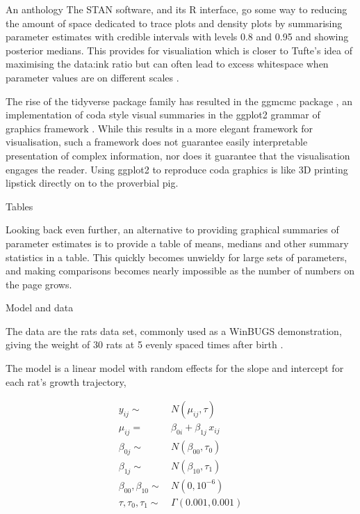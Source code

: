 {\begin{columns}
\begin{column}[t]{0.45\linewidth}
\begin{block}{An anthology}
The STAN software, and its R interface, go some way to reducing the amount of space dedicated to trace plots and density plots by summarising parameter estimates with credible intervals with levels 0.8 and 0.95 and showing posterior medians. This provides for visualiation which is closer to Tufte's idea of maximising the data:ink ratio but can often lead to excess whitespace when parameter values are on different scales \citep{tufte1983visual}.

The rise of the tidyverse package family \citep{tidyverse} has resulted in the ggmcmc package \citep{ggmcmc}, an implementation of coda style visual summaries in the ggplot2 grammar of graphics framework \citep{ggplot2}. While this results in a more elegant framework for visualisation, such a framework does not guarantee easily interpretable presentation of complex information, nor does it guarantee that the visualisation engages the reader. Using ggplot2 to reproduce coda graphics is like 3D printing lipstick directly on to the proverbial pig.

\end{block}

\begin{block}{Tables}
\setlength{\parskip}{15pt}
	
Looking back even further, an alternative to providing graphical summaries of parameter estimates is to provide a table of means, medians and other summary statistics in a table. This quickly becomes unwieldy for large sets of parameters, and making comparisons becomes nearly impossible as the number of numbers on the page grows.
	
\end{block}

 \begin{block}{Model and data}
	\setlength{\parskip}{15pt}
	
	The data are the rats data set, commonly used as a WinBUGS demonstration, giving the weight of 30 rats at 5 evenly spaced times after birth \citep{Gelfand1990}.
	
	The model is a linear model with random effects for the slope and intercept for each rat's growth trajectory,
	
	\begin{minipage}{0.45\linewidth}
		
		\begin{align*}
		y_{ij} \sim & \, N \left( \mu_{ij}, \tau \right) \\
		\mu_{ij} = & \, \beta_{0i} + \beta_{1j} \, x_{ij} \\
		\beta_{0j} \sim & \, N \left( \beta_{00}, \tau_0 \right) \\
		\beta_{1j} \sim & \, N \left( \beta_{10}, \tau_1 \right) \\
		\beta_{00}, \beta_{10}  \sim & \, N \left( 0, 10^{-6} \right) \\
		\tau , \tau_0, \tau_1 \sim & \, \Gamma\left( 0.001, 0.001 \right)
		\end{align*}
		

\end{minipage}
\end{block}
\end{column}
\end{columns}}
